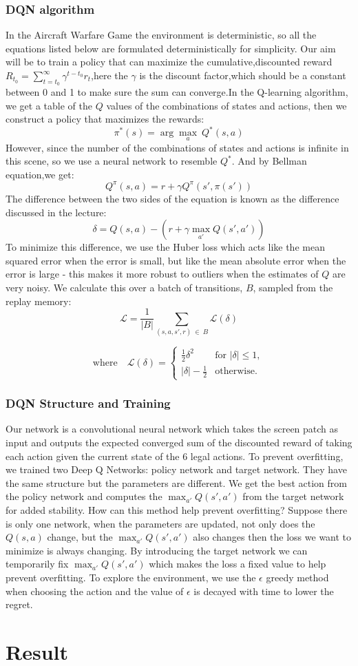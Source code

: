 \documentclass{article}
\begin{document}
    \subsubsection{DQN algorithm} In the Aircraft Warfare Game the environment is deterministic, so all the equations listed below are formulated deterministically for simplicity. Our aim will be to train a policy that can maximize the cumulative,discounted reward $R_{t_0} = \sum_{t=t_0}^{\infty} {\gamma}^{t-t_0}r_t$,here the $\gamma$ is the discount factor,which should be a constant between 0 and 1 to make sure the sum can converge.In the Q-learning algorithm, we get a table of the $Q$ values of the combinations of states and actions, then we construct a policy that maximizes the rewards:
    $$\pi^*(s) = \arg\!\max_a \ Q^*(s, a)$$
    However, since the number of the combinations of states and actions is infinite in this scene, so we use a neural network to resemble $Q^*$. And by Bellman equation,we get:
    $$Q^{\pi}(s, a) = r + \gamma Q^{\pi}(s', \pi(s'))$$
    The difference between the two sides of the equation is known as the difference discussed in the lecture:
    $$\delta = Q(s, a) - (r + \gamma \max_{a'} Q(s', a'))$$
    To minimize this difference, we use the Huber loss which acts
    like the mean squared error when the error is small, but like the mean
    absolute error when the error is large - this makes it more robust to
    outliers when the estimates of $Q$ are very noisy. We calculate
    this over a batch of transitions, $B$, sampled from the replay
    memory:
    $$\mathcal{L} = \frac{1}{|B|}\sum_{(s, a, s', r) \ \in \ B} \mathcal{L}(\delta)$$
    
    $$\text{where} \quad \mathcal{L}(\delta) = \begin{cases}
         \frac{1}{2}{\delta^2}  & \text{for } |\delta| \le 1, \\
         |\delta| - \frac{1}{2} & \text{otherwise.}
       \end{cases}$$
    \subsubsection{DQN Structure and Training}
    Our network is a convolutional neural network which takes the screen patch as input and outputs the expected converged sum of the discounted reward of taking each action given the current state of the 6 legal actions. To prevent overfitting, we trained two Deep Q Networks: policy network and target network. They have the same structure but the parameters are different. We get the best action from the policy network and computes the $\max_{a'} Q(s', a')$ from the target network for added stability. How can this method help prevent overfitting? Suppose there is only one network, when the parameters are updated, not only does the $Q(s, a)$ change, but the $\max_{a'} Q(s', a')$ also changes then the loss we want to minimize is always changing. By introducing the target network we can temporarily fix $\max_{a'} Q(s', a')$ which makes the loss a fixed value to help prevent overfitting. To explore the environment, we use the $\epsilon$ greedy method when choosing the action and the value of $\epsilon$ is decayed with time to lower the regret.
\section{Result}

\appendix
\end{document}
